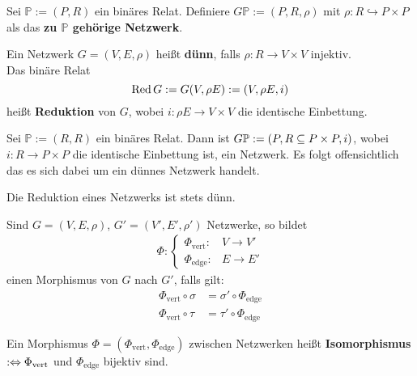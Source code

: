 \begin{definition}
	Sei $\mathbb{P}:=(P,R)$ ein binäres Relat. 
	Definiere $G\mathbb{P}:=(P,R,\rho)$ mit $\rho:R\hookrightarrow P\times P$ als das \textbf{zu $\mathbb{P}$ gehörige Netzwerk}.
\end{definition}

\begin{definition}
    Ein Netzwerk $G=(V,E,\rho)$ heißt \textbf{dünn}, 
    falls $\rho:R\to V\times V$ injektiv.\\
    Das binäre Relat
    $$ \Red G := G(V, \rho E) := (V, \rho E, i)$$
    heißt \textbf{Reduktion} von $G$, wobei
    $i: \rho E \to V \times V$ die identische Einbettung.
\end{definition}

\begin{beispiel}
    Sei $\mathbb{P} := (R, R)$ ein binäres Relat.
    Dann ist $G\P := (P, R \subseteq P \times P, i)$, wobei
    $i: R \to P \times P$ die identische Einbettung ist,
    ein Netzwerk.
    Es folgt offensichtlich das es sich dabei um ein dünnes Netzwerk handelt.
\end{beispiel}

\begin{korollar}
    Die Reduktion eines Netzwerks ist stets dünn.
\end{korollar}

\begin{definition}
    Sind $G=(V,E,\rho)$, $G'=(V',E',\rho')$ Netzwerke, so bildet
    \begin{align*}
        \Phi:\left\lbrace\begin{array}{rl}
        \Phi_{\text{vert}}:&V\to V'\\
        \Phi_{\text{edge}}:&E\to E'
        \end{array}\right.
    \end{align*}
    einen Morphismus von $G$ nach $G'$, falls gilt:
    \begin{align*}
        \Phi_{\text{vert}}\circ\sigma&=\sigma'\circ\Phi_{\text{edge}}\\
        \Phi_{\text{vert}}\circ\tau&=\tau'\circ\Phi_{\text{edge}}
    \end{align*}
\end{definition}

\begin{definition}
    Ein Morphismus $\Phi=(\Phi_{\text{vert}},\Phi_{\text{edge}})$ zwischen Netzwerken heißt \textbf{Isomorphismus} $:\gdw\Phi_{\text{vert}}$ und $\Phi_{\text{edge}}$ bijektiv sind.
\end{definition}

